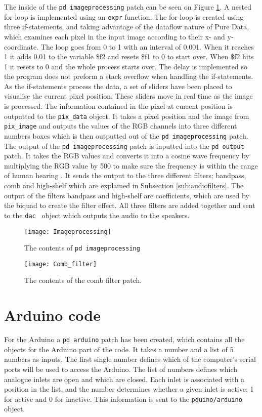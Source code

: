 The inside of the \texttt{pd imageprocessing} patch can be seen on Figure \ref{Fig:Imageprocessing}. A nested for-loop is implemented using an \texttt{expr} function. The for-loop is created using three if-statements, and taking advantage of the dataflow nature of Pure Data, which examines each pixel in the input image according to their x- and y-coordinate.
The loop goes from 0 to 1 with an interval of 0.001. When it reaches 1 it adds 0.01 to the variable \$f2 and resets \$f1 to 0 to start over. When \$f2 hits 1 it resets to 0 and the whole process starts over. The delay is implemented so the program does not preform a stack overflow when handling the if-statements. 
As the if-statements process the data, a set of sliders have been placed to visualise the current pixel position. These sliders move in real time as the image is processed. The information contained in the pixel at current position is outputted to the \texttt{pix\_data} object. It takes a pixel position and the image from \texttt{pix\_image} and outputs the values of the RGB channels into three different numbers boxes which is then outputted out of the \texttt{pd imageprocessing} patch. The output of the \texttt{pd imageprocessing} patch is inputted into the \texttt{pd output} patch. It takes the RGB values and converts it into a cosine wave frequency by multiplying the RGB value by 500 to make sure the frequency is within the range of human hearing \cite{steiglitz1997digital}. It sends the output to the three different filters; bandpass, comb and high-shelf which are explained in Subsection \ref{sub:audiofilters}. The output of the filters bandpass and high-shelf are coefficients, which are used by the biquad to create the filter effect. All three filters are added together and sent to the \texttt{dac~} object which outputs the audio to the speakers. 

\begin{figure}
\centering
\texttt{[image: Imageprocessing]}
\caption{The contents of \texttt{pd imageprocessing}}
\label{Fig:Imageprocessing}
\end{figure}

\begin{figure}
\centering
\texttt{[image: Comb\_filter]}
\caption{The contents of the comb filter patch.}
\label{Fig:Comb_filter}
\end{figure}

\section{Arduino code}
For the Arduino a \texttt{pd arduino} patch has been created, which contains all the objects for the Arduino part of the code. It takes a number and a list of 5 numbers as inputs. The first single number defines which of the computer's serial ports will be used to access the Arduino. The list of numbers defines which analogue inlets are open and which are closed. Each inlet is associated with a position in the list, and the number determines whether a given inlet is active; 1 for active and 0 for inactive. This information is sent to the \texttt{pduino/arduino} object.

